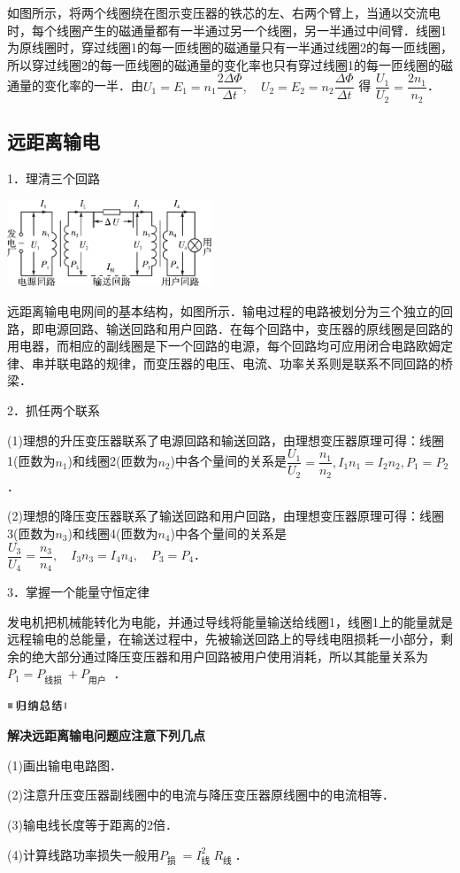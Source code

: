 如图所示，将两个线圈绕在图示变压器的铁芯的左、右两个臂上，当通以交流电时，每个线圈产生的磁通量都有一半通过另一个线圈，另一半通过中间臂．线圈1为原线圈时，穿过线圈1的每一匝线圈的磁通量只有一半通过线圈2的每一匝线圈，所以穿过线圈2的每一匝线圈的磁通量的变化率也只有穿过线圈1的每一匝线圈的磁通量的变化率的一半．由$U_1=E_1=n_{1} \dfrac{2 \Delta \Phi}{\Delta t}, \quad U_{2}=E_{2}=n_{2} \dfrac{\Delta \Phi}{\Delta t}$ 得 $\dfrac{U_{1}}{U_{2}}=\dfrac{2 n_{1}}{n_{2}}$．


\newpage
\subsection{远距离输电}

1．理清三个回路

\begin{center}\includegraphics[width=2.40556in,height=1.01875in]{media/image463.png}\end{center}

远距离输电电网间的基本结构，如图所示．输电过程的电路被划分为三个独立的回路，即电源回路、输送回路和用户回路．在每个回路中，变压器的原线圈是回路的用电器，而相应的副线圈是下一个回路的电源，每个回路均可应用闭合电路欧姆定律、串并联电路的规律，而变压器的电压、电流、功率关系则是联系不同回路的桥梁．

2．抓任两个联系

(1)理想的升压变压器联系了电源回路和输送回路，由理想变压器原理可得：线圈1(匝数为$n_1$)和线圈2(匝数为$n_2$)中各个量间的关系是$\dfrac{U_{1}}{U_{2}}=\dfrac{n_{1}}{n_{2}}, I_{1} n_{1}=I_{2} n_{2}, P_{1}=P_{2}$．

(2)理想的降压变压器联系了输送回路和用户回路，由理想变压器原理可得：线圈3(匝数为$n_3$)和线圈4(匝数为$n_4$)中各个量间的关系是$\dfrac{U_{3}}{U_{4}}=\dfrac{n_{3}}{n_{4}}, \quad I_{3} n_{3}=I_{4} n_{4}, \quad P_{3}=P_{4}$．

3．掌握一个能量守恒定律

发电机把机械能转化为电能，并通过导线将能量输送给线圈1，线圈1上的能量就是远程输电的总能量，在输送过程中，先被输送回路上的导线电阻损耗一小部分，剩余的绝大部分通过降压变压器和用户回路被用户使用消耗，所以其能量关系为$P_{1}=P_{\text {线损 }}+P_{\text {用户 }}$ ．

\begin{center}\includegraphics[width=0.70764in,height=0.12292in]{media/image13.png}\end{center}
\begin{center}
	\textbf{解决远距离输电问题应注意下列几点}
\end{center}

(1)画出输电电路图．

(2)注意升压变压器副线圈中的电流与降压变压器原线圈中的电流相等．

(3)输电线长度等于距离的2倍．

(4)计算线路功率损失一般用$P_{\text {损 }}=I_{\text {线 }}^2R_{\text {线 }}$．
